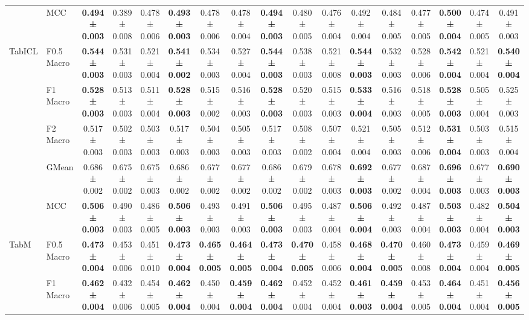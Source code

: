 \begin{table}[H]
{\begin{tabular}{llccccccccccccccc}
 & MCC & \textbf{0.494 ± 0.003} & 0.389 ± 0.008 & 0.478 ± 0.006 & \textbf{0.493 ± 0.003} & 0.478 ± 0.006 & 0.478 ± 0.004 & \textbf{0.494 ± 0.003} & 0.480 ± 0.005 & 0.476 ± 0.004 & 0.492 ± 0.004 & 0.484 ± 0.005 & 0.477 ± 0.005 & \textbf{0.500 ± 0.004} & 0.474 ± 0.005 & 0.491 ± 0.003 \\
\cline{1-17}
\multirow[t]{5}{*}{TabICL} & F0.5 Macro & \textbf{0.544 ± 0.003} & 0.531 ± 0.003 & 0.521 ± 0.004 & \textbf{0.541 ± 0.002} & 0.534 ± 0.003 & 0.527 ± 0.004 & \textbf{0.544 ± 0.003} & 0.538 ± 0.003 & 0.521 ± 0.008 & \textbf{0.544 ± 0.003} & 0.532 ± 0.003 & 0.528 ± 0.006 & \textbf{0.542 ± 0.004} & 0.521 ± 0.004 & \textbf{0.540 ± 0.004} \\
 & F1 Macro & \textbf{0.528 ± 0.003} & 0.513 ± 0.003 & 0.511 ± 0.004 & \textbf{0.528 ± 0.003} & 0.515 ± 0.002 & 0.516 ± 0.003 & \textbf{0.528 ± 0.003} & 0.520 ± 0.003 & 0.515 ± 0.003 & \textbf{0.533 ± 0.004} & 0.516 ± 0.003 & 0.518 ± 0.005 & \textbf{0.528 ± 0.003} & 0.505 ± 0.004 & 0.525 ± 0.003 \\
 & F2 Macro & 0.517 ± 0.003 & 0.502 ± 0.003 & 0.503 ± 0.003 & 0.517 ± 0.003 & 0.504 ± 0.003 & 0.505 ± 0.003 & 0.517 ± 0.003 & 0.508 ± 0.002 & 0.507 ± 0.004 & 0.521 ± 0.004 & 0.505 ± 0.003 & 0.512 ± 0.006 & \textbf{0.531 ± 0.004} & 0.503 ± 0.003 & 0.515 ± 0.004 \\
 & GMean & 0.686 ± 0.002 & 0.675 ± 0.002 & 0.675 ± 0.003 & 0.686 ± 0.002 & 0.677 ± 0.002 & 0.677 ± 0.002 & 0.686 ± 0.002 & 0.679 ± 0.002 & 0.678 ± 0.003 & \textbf{0.692 ± 0.003} & 0.677 ± 0.002 & 0.687 ± 0.004 & \textbf{0.696 ± 0.003} & 0.677 ± 0.003 & \textbf{0.690 ± 0.003} \\
 & MCC & \textbf{0.506 ± 0.003} & 0.490 ± 0.003 & 0.486 ± 0.005 & \textbf{0.506 ± 0.003} & 0.493 ± 0.003 & 0.491 ± 0.003 & \textbf{0.506 ± 0.003} & 0.495 ± 0.003 & 0.487 ± 0.004 & \textbf{0.506 ± 0.004} & 0.492 ± 0.003 & 0.487 ± 0.004 & \textbf{0.503 ± 0.003} & 0.482 ± 0.004 & \textbf{0.504 ± 0.003} \\
\cline{1-17}
\multirow[t]{5}{*}{TabM} & F0.5 Macro & \textbf{0.473 ± 0.004} & 0.453 ± 0.006 & 0.451 ± 0.010 & \textbf{0.473 ± 0.004} & \textbf{0.465 ± 0.005} & \textbf{0.464 ± 0.005} & \textbf{0.473 ± 0.004} & \textbf{0.470 ± 0.005} & 0.458 ± 0.006 & \textbf{0.468 ± 0.004} & \textbf{0.470 ± 0.005} & 0.460 ± 0.008 & \textbf{0.473 ± 0.004} & 0.459 ± 0.004 & \textbf{0.469 ± 0.005} \\
 & F1 Macro & \textbf{0.462 ± 0.004} & 0.432 ± 0.006 & 0.454 ± 0.005 & \textbf{0.462 ± 0.004} & 0.450 ± 0.004 & \textbf{0.459 ± 0.004} & \textbf{0.462 ± 0.004} & 0.452 ± 0.004 & 0.452 ± 0.004 & \textbf{0.461 ± 0.003} & \textbf{0.459 ± 0.004} & 0.453 ± 0.005 & \textbf{0.464 ± 0.004} & 0.451 ± 0.004 & \textbf{0.456 ± 0.005} \\

\end{tabular}}
\end{table}
